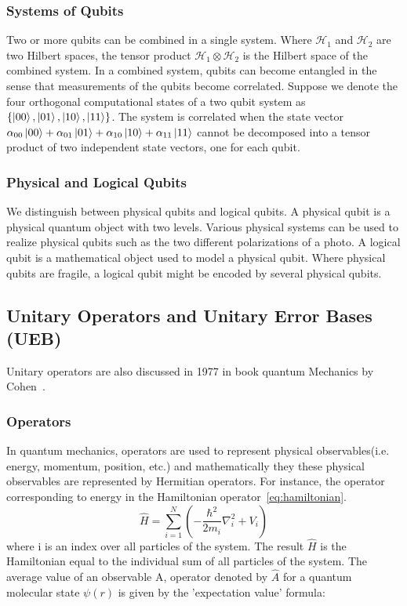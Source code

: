 \subsubsection{Systems of Qubits}
Two or more qubits can be combined in a single system.
Where $\mathcal{H}_1$ and $\mathcal{H}_2$ are two Hilbert spaces, the tensor product $\mathcal{H}_1 \otimes \mathcal{H}_2$ is the Hilbert space of the combined system.
In a combined system, qubits can become entangled in the sense that measurements of the qubits become correlated.
Suppose we denote the four orthogonal computational states of a two qubit system as $\{\ket{00}, \ket{01}, \ket{10}, \ket{11}\}$.
The system is correlated when the state vector $\alpha_{00} \ket{00} + \alpha_{01} \ket{01} + \alpha_{10} \ket{10} + \alpha_{11} \ket{11}$ cannot be decomposed into a tensor product of two independent state vectors, one for each qubit.

\subsubsection{Physical and Logical Qubits}
We distinguish between physical qubits and logical qubits.
A physical qubit is a physical quantum object with two levels.
Various physical systems can be used to realize physical qubits such as the two different polarizations of a photo.
A logical qubit is a mathematical object used to model a physical qubit.
Where physical qubits are fragile, a logical qubit might be encoded by several physical qubits.

\subsection{Unitary Operators and Unitary Error Bases (UEB)}
Unitary operators are also discussed in 1977 in book quantum Mechanics by Cohen~\cite{cohen1977quantummechanics1st}.

\subsubsection{Operators}

In quantum mechanics, operators are used to represent physical observables(i.e. energy, momentum, position, etc.) and mathematically they these physical observables are represented by Hermitian operators. For instance, the operator corresponding to energy in the Hamiltonian operator~\ref{eq:hamiltonian}.
\begin{equation}
\hat{H} = \sum_{i=1}^{N}(-\frac{\hbar^{2}}{2m_{i}}\nabla_{i}^{2}+V_{i})
\label{eq:hamiltonian}
\end{equation}
where i is an index over all particles of the system. The result $\hat{H}$ is the Hamiltonian equal to the individual sum of all particles of the system. The average value of an observable A, operator denoted by $\hat{A}$ for a quantum molecular state $\psi{(r)}$ is given by the 'expectation value' formula:

